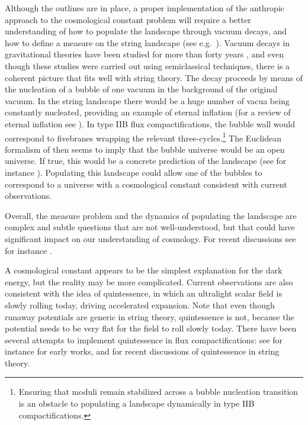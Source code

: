 \documentclass[12pt,a4wide]{article}
\begin{document}
Although the outlines are in place, a proper implementation of the anthropic approach to the cosmological constant problem will require a better understanding of how to populate the landscape through vacuum decays, and how to define a measure on the string landscape (see e.g.~\cite{Bousso:2008hz}). Vacuum decays in gravitational theories have been studied for more than forty years \cite{Coleman:1980aw,Brown:1988kg,Fischler:1990pk}, and even though these studies were carried out using semiclassical techniques, there is a coherent picture that fits well with string theory.
The decay proceeds by means of the nucleation of a bubble of one vacuum in the background of the original vacuum. In the string landscape there would be a huge number of vacua being constantly nucleated, providing an example of eternal inflation (for a review of eternal inflation see \cite{Guth:2007ng}). In type IIB flux compactifications, the bubble wall  would correspond to fivebranes wrapping the relevant three-cycles.\footnote{Ensuring that moduli remain stabilized across a bubble nucleation transition is an obstacle to populating a landscape dynamically in type IIB compactifications.}  The Euclidean formalism of \cite{Coleman:1980aw} then seems to imply that the bubble universe would be an open universe.  If true, this would be a concrete prediction of the landscape (see for instance \cite{Freivogel:2005vv}). Populating this landscape could allow one of the bubbles to correspond to a universe with a cosmological constant consistent with current observations.

Overall, the measure problem and the dynamics of populating the landscape are complex and subtle questions that are not well-understood, but that could have significant impact on our understanding of cosmology.  For recent discussions see for instance \cite{Hebecker:2018ofv,Hebecker:2020aqr,McNamara:2020uza,DeAlwis:2019rxg,Cespedes:2020xpn,Cespedes:2023jdk,Friedrich:2023tid,Carifio:2017nyb,Khoury:2019yoo,Giudice:2021viw,Kartvelishvili:2020thd,Khoury:2022ish}.
 
A cosmological constant appears to be the simplest explanation for the dark energy, but the reality may be more complicated.   
Current observations are also consistent with the idea of quintessence, in which an ultralight scalar field is slowly  rolling today, driving accelerated expansion.
Note that even though runaway potentials are generic in string theory, quintessence is not, 
because
the potential needs to be very flat for the field to roll  slowly today. 
There have been several attempts to implement quintessence in flux compactifications:
see for instance \cite{Hellerman:2001yi,Fischler:2001yj,Svrcek:2006hf,Panda:2010uq} for early works, and \cite{Denef:2018etk,Cicoli:2018kdo,Hebecker:2019csg,Cicoli:2021fsd, Cicoli:2021skd,Cicoli:2023opf} for recent discussions of quintessence in string theory.
\end{document}
